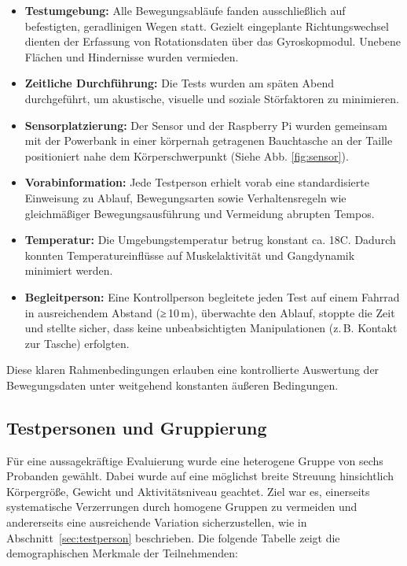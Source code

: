 \begin{itemize}
	\item \textbf{Testumgebung:} Alle Bewegungsabläufe fanden ausschließlich auf befestigten, geradlinigen Wegen statt. Gezielt eingeplante Richtungswechsel dienten der Erfassung von Rotationsdaten über das Gyroskopmodul. Unebene Flächen und Hindernisse wurden vermieden.
	
	\item \textbf{Zeitliche Durchführung:} Die Tests wurden am späten Abend durchgeführt, um akustische, visuelle und soziale Störfaktoren zu minimieren.
	
	\item \textbf{Sensorplatzierung:} Der Sensor und der Raspberry Pi wurden gemeinsam mit der Powerbank in einer körpernah getragenen Bauchtasche an der Taille positioniert  nahe dem Körperschwerpunkt (Siehe Abb. \ref{fig:sensor}).
	
	\item \textbf{Vorabinformation:} Jede Testperson erhielt vorab eine standardisierte Einweisung zu Ablauf, Bewegungsarten sowie Verhaltensregeln wie gleichmäßiger Bewegungsausführung und Vermeidung abrupten Tempos.
	
	\item \textbf{Temperatur:} Die Umgebungstemperatur betrug konstant ca. 18\textdegree C. Dadurch konnten Temperatureinflüsse auf Muskelaktivität und Gangdynamik minimiert werden.
	
	\item \textbf{Begleitperson:} Eine Kontrollperson begleitete jeden Test auf einem Fahrrad in ausreichendem Abstand (≥ 10\,m), überwachte den Ablauf, stoppte die Zeit und stellte sicher, dass keine unbeabsichtigten Manipulationen (z.\,B. Kontakt zur Tasche) erfolgten.
\end{itemize}

Diese klaren Rahmenbedingungen erlauben eine kontrollierte Auswertung der Bewegungsdaten unter weitgehend konstanten äußeren Bedingungen.

\subsection{Testpersonen und Gruppierung}
\label{sec:testpersonen}

Für eine aussagekräftige Evaluierung wurde eine heterogene Gruppe von sechs Probanden gewählt. Dabei wurde auf eine möglichst breite Streuung hinsichtlich Körpergröße, Gewicht und Aktivitätsniveau geachtet. Ziel war es, einerseits systematische Verzerrungen durch homogene Gruppen zu vermeiden und andererseits eine ausreichende Variation sicherzustellen, wie in Abschnitt~\ref{sec:testperson} beschrieben. Die folgende Tabelle zeigt die demographischen Merkmale der Teilnehmenden:

